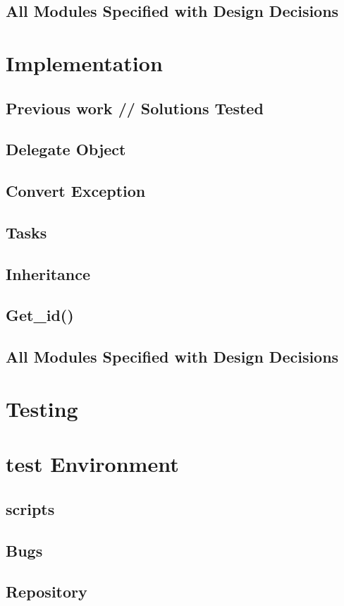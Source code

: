 \documentclass[a4paper,11pt,onecolumn,notitlepage]{article}
\begin{document}
\subsection{All Modules Specified with Design Decisions}
\pagebreak[0]

\section{Implementation}
\subsection{Previous work // Solutions Tested}
\subsection{Delegate Object}
\subsection{Convert Exception}
\subsection{Tasks}
\subsection{Inheritance}
\subsection{ Get\_id()}
\subsection{All Modules Specified with Design Decisions}
\pagebreak[0]


\section{Testing}
\section{test Environment}
\subsection{scripts}
\subsection{Bugs}
\subsection{Repository}
\pagebreak[0]
\end{document}
